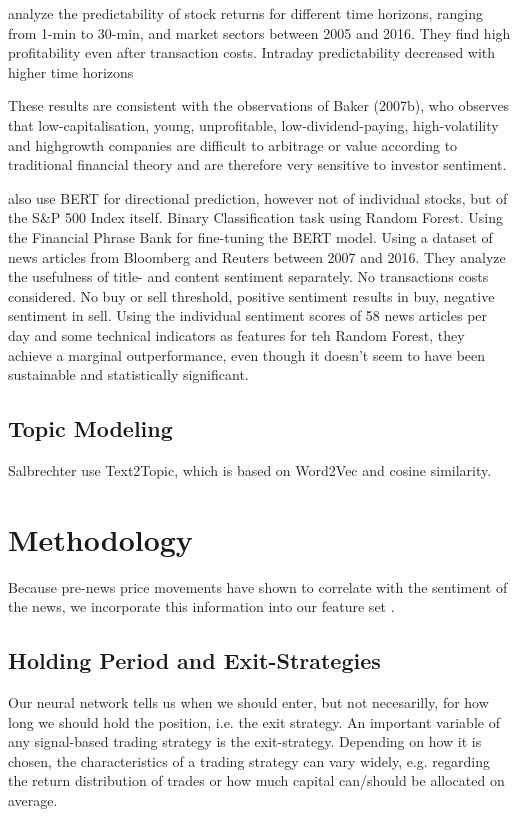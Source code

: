 \documentclass[12pt,a4paper]{article}
\begin{document}
	
	\bigskip
	\textbf{\cite{liu_intraday_2023}} analyze the predictability of stock returns for different time horizons, ranging from 1-min to 30-min, and market sectors between 2005 and 2016.
	They find high profitability even after transaction costs.
	Intraday predictability decreased with higher time horizons
	
	
	\bigskip
	These results are consistent with the observations of Baker (2007b), who observes that low-capitalisation, young, unprofitable, low-dividend-paying, high-volatility and highgrowth companies are difficult to arbitrage or value according to traditional financial theory and are therefore very sensitive to investor sentiment.
	
	\bigskip
	\textbf{\cite{fazlija_using_2022}} also use BERT for directional prediction, however not of individual stocks, but of the S\&P 500 Index itself.
	Binary Classification task using Random Forest.
	Using the Financial Phrase Bank for fine-tuning the BERT model. %
	Using a dataset of news articles from Bloomberg and Reuters between 2007 and 2016. %
	They analyze the usefulness of title- and content sentiment separately.
	No transactions costs considered.
	No buy or sell threshold, positive sentiment results in buy, negative sentiment in sell.
	Using the individual sentiment scores of 58 news articles per day and some technical indicators as features for teh
	Random Forest, they achieve a marginal outperformance, even though it doesn't seem to have been sustainable and statistically significant.
	
	\subsection{Topic Modeling}
	Salbrechter use Text2Topic, which is based on Word2Vec and cosine similarity.
	
	
	
	
	\section{Methodology}
	Because pre-news price movements have shown to correlate with the sentiment of the news, we incorporate this information
	into our feature set \cite{ke_predicting_2020}.
	
	\subsection{Holding Period and Exit-Strategies}
	Our neural network tells us when we should enter, but not necesarilly, for how long we should hold the position, i.e. the exit strategy.
	An important variable of any signal-based trading strategy is the exit-strategy.
	Depending on how it is chosen, the characteristics of a trading strategy can vary widely, e.g. regarding the return distribution of trades or how much capital can/should be allocated on average.
	
\end{document}

